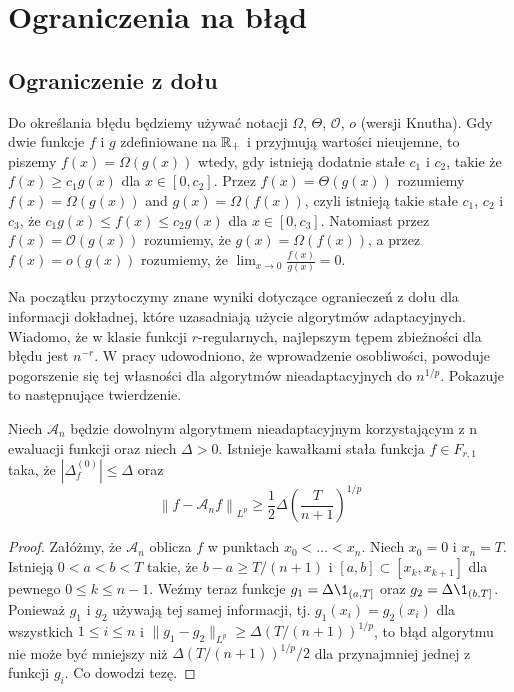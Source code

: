 \documentclass[oik, pdftex, robocza, man]{mgrwms}
\begin{document}
\mgrclosechapter


\chapter{Ograniczenia na błąd}


\section{Ograniczenie z dołu}


    Do określania błędu będziemy używać notacji $\varOmega$, $\varTheta$, $\mathcal{O}$, $\textit{o}$ (wersji Knutha). Gdy dwie funkcje $f$ i $g$ zdefiniowane na $\mathbb{R}_{+}$ i przyjmują wartości nieujemne, to piszemy $f(x) = \varOmega\left( g(x) \right)$ wtedy, gdy istnieją dodatnie stałe $c_{1}$ i $c_{2}$, takie że $f(x) \geq c_{1} g(x)$ dla $x \in [0, c_{2}]$. Przez $f(x) = \varTheta\left( g(x) \right)$ rozumiemy $f(x) = \varOmega\left( g(x) \right)$ and $g(x) = \varOmega\left( f(x) \right)$, czyli istnieją takie stałe $c_{1}$, $c_{2}$ i $c_{3}$, że $c_{1} g(x) \leq f(x) \leq c_{2} g(x)$ dla $x \in [0, c_{3}]$. Natomiast przez $f(x) = \mathcal{O}(g(x))$ rozumiemy, że $g(x) = \varOmega(f(x))$, a przez $f(x) = \textit{o}(g(x))$ rozumiemy, że $\displaystyle \lim_{x \rightarrow 0} \frac{f(x)}{g(x)} = 0$.

    Na początku przytoczymy znane wyniki dotyczące ogranieczeń z dołu dla informacji dokładnej, które uzasadniają użycie algorytmów adaptacyjnych. Wiadomo, że w klasie funkcji $r$-regularnych, najlepszym tępem zbieżności dla błędu jest $n^{-r}$. W pracy \cite{PoA} udowodniono, że wprowadzenie osobliwości, powoduje pogorszenie się tej własności dla algorytmów nieadaptacyjnych do $n^{1/p}$. Pokazuje to następnujące twierdzenie.

    \begin{thm}
        Niech $\mathcal{A}_{n}$ będzie dowolnym algorytmem nieadaptacyjnym korzystającym z n ewaluacji funkcji oraz niech $\Delta > 0$. Istnieje kawałkami stała funkcja $f \in F_{r, 1}$ taka, że $|\Delta_{f}^{(0)}| \leq \Delta$ oraz
        \begin{equation*}
            \left\| f - \mathcal{A}_{n}f \right\|_{L^{p}} \geq \frac{1}{2}\Delta \left( \frac{T}{n+1} \right)^{1/p}
        \end{equation*}
    \end{thm}
    \begin{proof}
        Załóżmy, że $\mathcal{A}_{n}$ oblicza $f$ w punktach $x_{0} < \ldots < x_{n}$. Niech $x_{0} = 0$ i $x_{n} = T$. Istnieją $0 < a < b < T$ takie, że $b-a \geq T/(n+1)$ i $[a,b] \subset [x_{k}, x_{k+1}]$ dla pewnego $0 \leq k \leq n-1$. Weźmy teraz funkcje $g_{1} = \Delta\1_{(a, T]}$ oraz $g_{2} = \Delta\1_{(b, T]}$. Ponieważ $g_{1}$ i $g_{2}$ używają tej samej informacji, tj. $g_{1}(x_{i}) = g_{2}(x_{i})$ dla wszystkich $1 \leq i \leq n$ i $\| g_{1} - g_{2} \|_{L^{p}} \geq \Delta(T / (n+1))^{1/p}$, to błąd algorytmu nie może być mniejszy niż $\Delta(T/(n+1))^{1/p} / 2$ dla przynajmniej jednej z funkcji $g_{i}$. Co dowodzi tezę.
    \end{proof}
\end{document}
